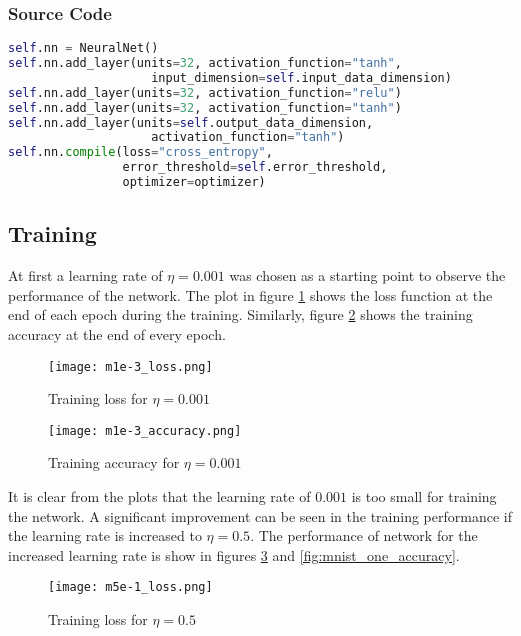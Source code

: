 \documentclass{article}
\begin{document}
\subsubsection{Source Code}
\begin{lstlisting}[language=python]
self.nn = NeuralNet()
self.nn.add_layer(units=32, activation_function="tanh",
                    input_dimension=self.input_data_dimension)
self.nn.add_layer(units=32, activation_function="relu")
self.nn.add_layer(units=32, activation_function="tanh")
self.nn.add_layer(units=self.output_data_dimension,
                    activation_function="tanh")
self.nn.compile(loss="cross_entropy",
                error_threshold=self.error_threshold,
                optimizer=optimizer)
\end{lstlisting}

\subsection{Training}
At first a learning rate of $\eta = 0.001$ was chosen as a starting point
to observe the performance of the network. The plot in figure \ref{fig:mnist_three_loss} shows
the loss function at the end of each epoch during the training. Similarly, figure \ref{fig:mnist_three_accuracy} shows the
training accuracy at the end of every epoch.

\begin{figure}[!ht]
  \texttt{[image: m1e-3\_loss.png]}
  \caption{Training loss for $\eta = 0.001$}
  \label{fig:mnist_three_loss}
\end{figure}

\begin{figure}[!ht]
  \texttt{[image: m1e-3\_accuracy.png]}
  \caption{Training accuracy for $\eta = 0.001$}
  \label{fig:mnist_three_accuracy}
\end{figure}

It is clear from the plots that the learning rate of $0.001$ is too small for training the network. A
significant improvement can be seen in the training performance if the learning rate is increased to $\eta = 0.5$.
The performance of network for the increased learning rate is show in figures \ref{fig:mnist_one_loss} and \ref{fig:mnist_one_accuracy}.

\begin{figure}[!ht]
  \texttt{[image: m5e-1\_loss.png]}
  \caption{Training loss for $\eta = 0.5$}
  \label{fig:mnist_one_loss}
\end{figure}
\end{document}

